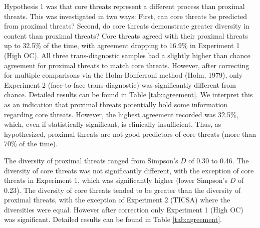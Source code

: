 \documentclass[
  man,floatsintext]{apa7}
\begin{document}
Hypothesis 1 was that core threats represent a different process than proximal threats.
This was investigated in two ways:
First, can core threats be predicted from proximal threats?
Second, do core threats demonstrate greater diversity in content than proximal threats?
Core threats agreed with their proximal threats up to 32.5\% of the time, with agreement dropping to 16.9\% in Experiment 1 (High OC).
All three trans-diagnostic samples had a slightly higher than chance agreement for proximal threats to match core threats.
However, after correcting for multiple comparisons via the Holm-Bonferroni method (Holm, 1979), only Experiment 2 (face-to-face trans-diagnostic) was significantly different from chance.
Detailed results can be found in Table \ref{tab:agreement}.
We interpret this as an indication that proximal threats potentially hold some information regarding core threats.
However, the highest agreement recorded was 32.5\%, which, even if statistically significant, is clinically insufficient.
Thus, as hypothesized, proximal threats are not good predictors of core threats (more than 70\% of the time).

The diversity of proximal threats ranged from Simpson's \(D\) of 0.30 to 0.46.
The diversity of core threats was not significantly different, with the exception of core threats in Experiment 1, which was significantly higher (lower Simpson's \(D\) of 0.23).
The diversity of core threats tended to be greater than the diversity of proximal threats, with the exception of Experiment 2 (TICSA) where the diversities were equal.
However after correction only Experiment 1 (High OC) was significant.
Detailed results can be found in Table \ref{tab:agreement}.
\end{document}

